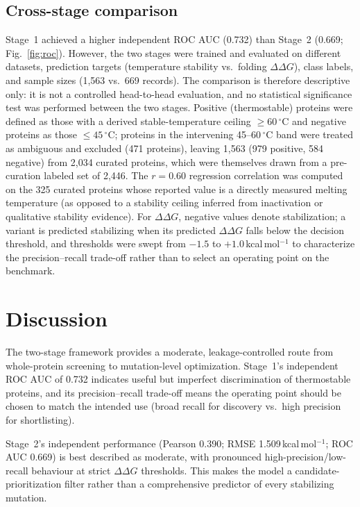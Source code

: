 \documentclass[sn-nature]{sn-jnl}%
\newcommand{\ddg}{\ensuremath{\Delta\Delta G}}
\begin{document}
\subsection{Cross-stage comparison}\label{sec:compare}
Stage~1 achieved a higher independent ROC AUC (0.732) than Stage~2 (0.669; Fig.~\ref{fig:roc}). However, the
two stages were trained and evaluated on different datasets, prediction targets
(temperature stability vs.\ folding \ddg), class labels, and sample sizes (1{,}563 vs.\ 669
records). The comparison is therefore descriptive only: it is not a controlled
head-to-head evaluation, and no statistical significance test was performed between the two
stages.
Positive (thermostable) proteins were defined as those with a derived stable-temperature
ceiling $\geq 60\,^{\circ}$C and negative proteins as those $\leq 45\,^{\circ}$C; proteins in
the intervening 45--60\,$^{\circ}$C band were treated as ambiguous and excluded (471
proteins), leaving 1{,}563 (979 positive, 584 negative) from 2{,}034 curated proteins, which
were themselves drawn from a pre-curation labeled set of 2{,}446. The $r=0.60$ regression
correlation was computed on the 325 curated proteins whose reported value is a directly
measured melting temperature (as opposed to a stability ceiling inferred from inactivation or
qualitative stability evidence). For \ddg, negative values denote stabilization; a variant is
predicted stabilizing when its predicted \ddg{} falls below the decision threshold, and
thresholds were swept from $-1.5$ to $+1.0$\,kcal\,mol$^{-1}$ to characterize the
precision--recall trade-off rather than to select an operating point on the benchmark.

\section{Discussion}\label{sec:discussion}
The two-stage framework provides a moderate, leakage-controlled route from whole-protein
screening to mutation-level optimization. Stage~1's independent ROC AUC of 0.732 indicates
useful but imperfect discrimination of thermostable proteins, and its precision--recall
trade-off means the operating point should be chosen to match the intended use (broad
recall for discovery vs.\ high precision for shortlisting).

Stage~2's independent performance (Pearson 0.390; RMSE 1.509\,kcal\,mol$^{-1}$; ROC AUC
0.669) is best described as moderate, with pronounced high-precision/low-recall behaviour
at strict \ddg{} thresholds. This makes the model a candidate-prioritization filter rather
than a comprehensive predictor of every stabilizing mutation.
\end{document}
